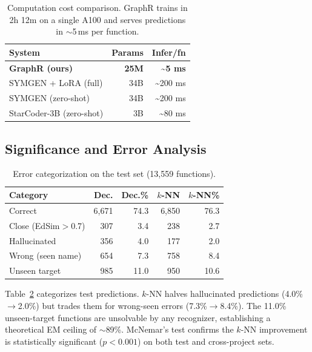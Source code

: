 \documentclass[sigconf,nonacm]{acmart}
\newcommand{\sysname}{\textsf{GraphR}}
\begin{document}
\begin{table}[t]
    \centering
    \caption{Computation cost comparison. \sysname{} trains in 2h 12m on a single A100 and serves predictions in $\sim$5\,ms per function.}
    \label{tab:cost-comparison}
    \footnotesize
    \begin{tabular}{lrr}
        \toprule
        \textbf{System} & \textbf{Params} & \textbf{Infer/fn} \\
        \midrule
        \textbf{\sysname{} (ours)} & \textbf{25M} & \textbf{\textasciitilde{}5 ms} \\
        SYMGEN + LoRA (full)       & 34B          & \textasciitilde{}200 ms \\
        SYMGEN (zero-shot)         & 34B          & \textasciitilde{}200 ms \\
        StarCoder-3B (zero-shot)   & 3B           & \textasciitilde{}80 ms \\
        \bottomrule
    \end{tabular}
\end{table}

\subsection{Significance and Error Analysis}

\begin{table}[t]
    \centering
    \caption{Error categorization on the test set (13{,}559 functions).}
    \label{tab:errors}
    \footnotesize
    \begin{tabular}{lrrrr}
        \toprule
        \textbf{Category} & \textbf{Dec.} & \textbf{Dec.\%} & \textbf{$k$-NN} & \textbf{$k$-NN\%} \\
        \midrule
        Correct & 6,671 & 74.3 & 6,850 & 76.3 \\
        Close (EdSim${>}$0.7) & 307 & 3.4 & 238 & 2.7 \\
        Hallucinated & 356 & 4.0 & 177 & 2.0 \\
        Wrong (seen name) & 654 & 7.3 & 758 & 8.4 \\
        Unseen target & 985 & 11.0 & 950 & 10.6 \\
        \bottomrule
    \end{tabular}
\end{table}

Table~\ref{tab:errors} categorizes test predictions. $k$-NN halves hallucinated predictions (4.0\%$\to$2.0\%) but trades them for wrong-seen errors (7.3\%$\to$8.4\%). The 11.0\% unseen-target functions are unsolvable by any recognizer, establishing a theoretical EM ceiling of ${\sim}$89\%. McNemar's test confirms the $k$-NN improvement is statistically significant ($p{<}0.001$) on both test and cross-project sets.
\end{document}
